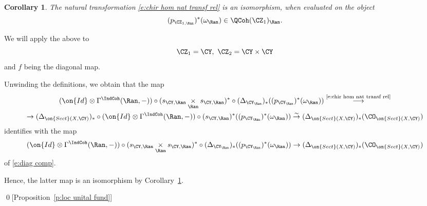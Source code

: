 \documentclass[9pt]{amsart}
\newtheorem{cor}[subsubsection]{Corollary}
\theoremstyle{remark}
\theoremstyle{definition}
\theoremstyle{remark}
\newcommand{\propref}[1]{Proposition~\ref{#1}}
\newcommand{\corref}[1]{Corollary~\ref{#1}}
\numberwithin{equation}{section}
\begin{document}
\begin{cor} \label{c:fact hom rel}
The natural transformation \eqref{e:chir hom nat transf rel} is an isomorphism, when evaluated on the object
$$(p_{\CZ_{1,\Ran}})^*(\omega_\Ran)\in \QCoh(\CZ_1)_\Ran.$$
\end{cor}

\sssec{}

We will apply the above to
$$\CZ_1=\CY,\,\, \CZ_2=\CY\times \CY$$
and $f$ being the diagonal map.

\medskip

Unwinding the definitions, we obtain that the map
\begin{multline}
(\on{Id}\otimes \Gamma^{\IndCoh}(\Ran,-))\circ (s_{\CY,\Ran}\underset{\Ran}\times s_{\CY,\Ran})^*\circ (\Delta_{\CY_\Ran})_*((p_{\CY_\Ran})^*(\omega_\Ran))
\overset{\text{\eqref{e:chir hom nat transf rel}}}\longrightarrow \\
\to (\Delta_{\on{Sect}(X,\CY)})_* \circ (\on{Id}\otimes \Gamma^{\IndCoh}(\Ran,-))\circ (s_{\CY,\Ran})^*((p_{\CY_\Ran})^*(\omega_\Ran)) 
\overset{\sim}\to (\Delta_{\on{Sect}(X,\CY)})_*(\CO_{\on{Sect}(X,\CY)})
\end{multline}
identifies with the map 
$$(\on{Id}\otimes \Gamma^{\IndCoh}(\Ran,-))\circ (s_{\CY,\Ran}\underset{\Ran}\times s_{\CY,\Ran})^*\circ (\Delta_{\CY_\Ran})_*((p_{\CY_\Ran})^*(\omega_\Ran))\to
(\Delta_{\on{Sect}(X,\CY)})_*(\CO_{\on{Sect}(X,\CY)})$$
of \eqref{e:diag comp}. 

\medskip

Hence, the latter map is an isomorphism by \corref{c:fact hom rel}. 

\qed[\propref{p:loc unital fund}]


 










\newpage
\end{document}
